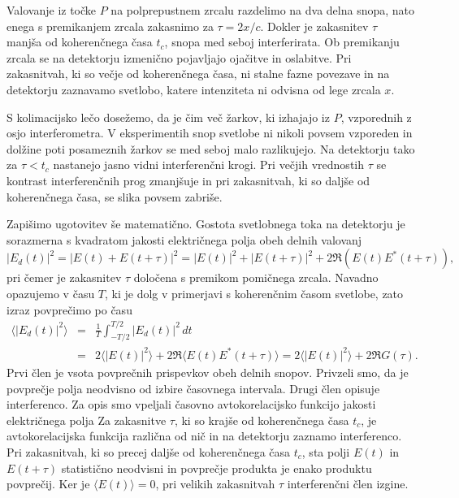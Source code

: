 Valovanje iz točke $P$ na polprepustnem zrcalu razdelimo na dva delna snopa, 
nato enega s premikanjem zrcala zakasnimo za $\tau=2x/c$. Dokler je zakasnitev
$\tau$ manjša od koherenčnega časa $t_{c}$, snopa med seboj interferirata.
Ob premikanju zrcala se na detektorju izmenično pojavljajo ojačitve in 
oslabitve. Pri zakasnitvah, ki so večje od koherenčnega časa, ni stalne fazne 
povezave in na detektorju zaznavamo svetlobo, katere intenziteta ni odvisna od lege
zrcala $x$.

\begin{remark}
S kolimacijsko lečo dosežemo, da je čim več žarkov, ki izhajajo iz
$P$, vzporednih z osjo interferometra. V eksperimentih snop svetlobe 
ni nikoli povsem vzporeden in dolžine poti posameznih žarkov se med
seboj malo razlikujejo. Na detektorju tako za $\tau < t_c$ nastanejo jasno 
vidni interferenčni krogi. Pri večjih vrednostih $\tau$  se kontrast interferenčnih
prog zmanjšuje in pri zakasnitvah, ki so daljše od koherenčnega časa, se 
slika povsem zabriše. 
\end{remark}

Zapišimo ugotovitev še matematično.
Gostota svetlobnega toka na detektorju je sorazmerna s kvadratom jakosti električnega
polja obeh delnih valovanj
\begin{equation}
|E_{d}(t)|^{2}=|E(t)+E(t+\tau)|^{2}=|E(t)|^{2}+|E(t+\tau)|^{2}+2\Re \left(E(t)E^{*}(t+\tau)\right),
\label{eq:Michelson-intenziteta}
\end{equation}
pri čemer je zakasnitev $\tau$ določena s premikom pomičnega zrcala.
Navadno opazujemo v času $T$, ki je dolg v primerjavi s koherenčnim
časom svetlobe, zato izraz povprečimo po času
\begin{eqnarray}
\langle|E_{d}(t)|^{2}\rangle & = & \frac{1}{T}\int_{-T/2}^{T/2}|E{}_{d}(t)|^{2}\, dt\nonumber \\
 & = & 2\langle|E(t)|^{2}\rangle+2\Re\langle E(t)E^{*}(t+\tau)\rangle = 2\langle|E(t)|^{2}\rangle+2\Re G(\tau).
 \label{eq:caskohav}
\end{eqnarray}
Prvi člen je vsota povprečnih prispevkov obeh delnih snopov. Privzeli smo, 
da je povprečje polja neodvisno od izbire časovnega intervala.
Drugi člen opisuje interferenco. 
Za opis smo vpeljali
časovno avtokorelacijsko funkcijo
jakosti električnega polja 
Za zakasnitve $\tau$, ki so krajše od koherenčnega časa $t_c$, je avtokorelacijska
funkcija različna od nič in na
detektorju zaznamo interferenco. Pri zakasnitvah, ki so precej
daljše od koherenčnega časa $t_{c}$, sta polji $E(t)$ in $E(t+\tau)$
statistično neodvisni in povprečje produkta je enako produktu povprečij.
Ker je $\langle E(t)\rangle=0$, pri velikih zakasnitvah $\tau$ interferenčni
člen izgine.

